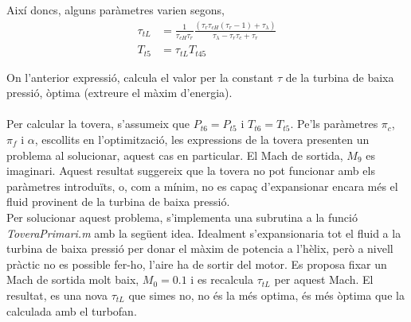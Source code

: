 \noindent Així doncs, alguns paràmetres varien segons,
\begin{align}
	\tau_{tL}&=\frac{1}{\tau_{cH}\tau_r}\frac{(\tau_r\tau_{cH}(\tau_r-1)+\tau_\lambda)}{\tau_\lambda-\tau_r\tau_{c}+\tau_r}\\
	T_{t5}&=\tau_{tL}T_{t45}
\end{align}

\noindent On l'anterior expressió, calcula el valor per la constant $\tau$ de la turbina de baixa pressió, òptima (extreure el màxim d'energia).\\
\\
Per calcular la tovera, s'assumeix que $P_{t6}=P_{t5}$ i $T_{t6}=T_{t5}$. Pe'ls paràmetres $\pi_c$, $\pi_f$ i $\alpha$, escollits en l'optimització, les expressions de la tovera presenten un problema al solucionar, aquest cas en particular. El Mach de sortida, $M_9$ es imaginari. Aquest resultat suggereix que la tovera no pot funcionar amb els paràmetres introduïts, o, com a mínim, no es capaç d'expansionar encara més el fluid provinent de la turbina de baixa pressió.\\

\noindent Per solucionar aquest problema, s'implementa una subrutina a la funció \textit{ToveraPrimari.m} amb la següent idea. Idealment s'expansionaria tot el fluid a la turbina de baixa pressió per donar el màxim de potencia a l'hèlix, però a nivell pràctic no es possible fer-ho, l'aire ha de sortir del motor. Es proposa fixar un Mach de sortida molt baix, $M_0 = 0.1$ i es recalcula $\tau_{tL}$ per aquest Mach. El resultat, es una nova $\tau_{tL}$ que simes no, no és la més optima, és més òptima que la calculada amb el turbofan.

